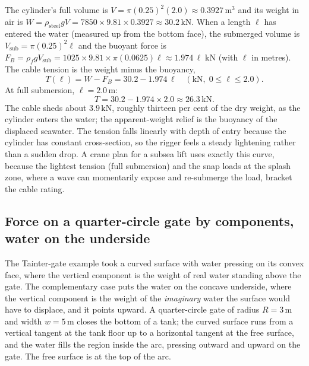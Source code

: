 The cylinder's full volume is $V = \pi (0.25)^2 (2.0) \approx 0.3927\,
\text{m}^3$ and its weight in air is $W = \rho_{\text{steel}} g V =
7850 \times 9.81 \times 0.3927 \approx 30.2\,\text{kN}$. When a length
$\ell$ has entered the water (measured up from the bottom face), the
submerged volume is $V_{\text{sub}} = \pi (0.25)^2 \ell$ and the buoyant
force is $F_B = \rho_f g V_{\text{sub}} = 1025 \times 9.81 \times \pi
(0.0625) \ell \approx 1.974\,\ell\;\text{kN}$ (with $\ell$ in metres).
The cable tension is the weight minus the buoyancy,
\[
T(\ell) = W - F_B = 30.2 - 1.974\,\ell \quad (\text{kN},\; 0 \le \ell
\le 2.0).
\]
At full submersion, $\ell = 2.0\,\si{\meter}$:
\[
T = 30.2 - 1.974 \times 2.0 \approx 26.3\,\text{kN}.
\]
The cable sheds about $3.9\,\text{kN}$, roughly thirteen per cent of the
dry weight, as the cylinder enters the water; the apparent-weight relief
is the buoyancy of the displaced seawater. The tension falls linearly
with depth of entry because the cylinder has constant cross-section, so
the rigger feels a steady lightening rather than a sudden drop. A crane
plan for a subsea lift uses exactly this curve, because the lightest
tension (full submersion) and the snap loads at the splash zone, where a
wave can momentarily expose and re-submerge the load, bracket the cable
rating.

\subsection{Force on a quarter-circle gate by components, water on the underside}

The Tainter-gate example took a curved surface with water pressing on its
convex face, where the vertical component is the weight of real water
standing above the gate. The complementary case puts the water on the
concave underside, where the vertical component is the weight of the
\emph{imaginary} water the surface would have to displace, and it points
upward. A quarter-circle gate of radius $R = 3\,\si{\meter}$ and width
$w = 5\,\si{\meter}$ closes the bottom of a tank; the curved surface runs
from a vertical tangent at the tank floor up to a horizontal tangent at the
free surface, and the water fills the region inside the arc, pressing
outward and upward on the gate. The free surface is at the top of the arc.


